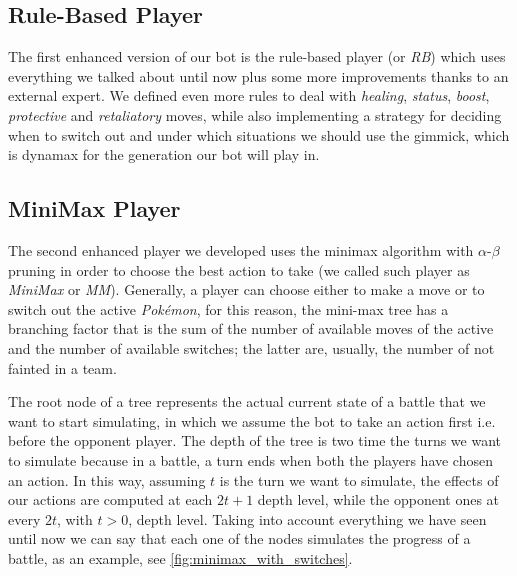 \subsection{Rule-Based Player}\label{subsec:rule_based_player}
The first enhanced version of our bot is the rule-based player (or \textit{RB}) which uses everything we talked about until now plus some more improvements thanks to an external expert. We defined even more rules to deal with \textit{healing}, \textit{status}, \textit{boost}, \textit{protective} and \textit{retaliatory} moves, while also implementing a strategy for deciding when to switch out and under which situations we should use the gimmick, which is dynamax for the generation our bot will play in.

\subsection{MiniMax Player}\label{subsec:minimax_player}
The second enhanced player we developed uses the minimax algorithm with $\alpha$-$\beta$ pruning in order to choose the best action to take (we called such player as \textit{MiniMax} or \textit{MM}). Generally, a player can choose either to make a move or to switch out the active \textit{Pokémon}, for this reason, the mini-max tree has a branching factor that is the sum of the number of available moves of the active \poke and the number of available switches; the latter are, usually, the number of not fainted \poke in a team.

The root node of a tree represents the actual current state of a battle that we want to start simulating, in which we assume the bot to take an action first i.e. before the opponent player. The depth of the tree is two time the turns we want to simulate because in a \poke battle, a turn ends when both the players have chosen an action. In this way, assuming $t$ is the turn we want to simulate, the effects of our actions are computed at each $2t + 1$ depth level, while the opponent ones at every $2t$, with $t>0$, depth level. Taking into account everything we have seen until now we can say that each one of the nodes simulates the progress of a battle, as an example, see \autoref{fig:minimax_with_switches}.

